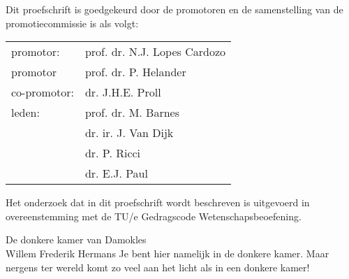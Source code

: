 \newpage
\thispagestyle{empty}

\noindent
Dit proefschrift is goedgekeurd door de promotoren en de samenstelling van de promotiecommissie is als volgt:\\[7mm]

\noindent
\begin{tabular}{@{}l p{9.8cm}}
promotor:                   &   prof. dr. N.J. Lopes Cardozo \\
promotor                    &   prof. dr. P. Helander \\
co-promotor:                &   dr. J.H.E. Proll \\
leden:                      &   prof. dr. M. Barnes \\
                            &   dr. ir. J. Van Dijk \\
                            &   dr. P. Ricci \\
                            &   dr. E.J. Paul \\
\end{tabular}

\vfill
\noindent
Het onderzoek dat in dit proefschrift wordt beschreven is uitgevoerd in overeenstemming met de TU/e Gedragscode Wetenschapsbeoefening. \newpage
\thispagestyle{empty}
\vspace*{\fill}
\begin{myquoting}{{\rm De donkere kamer van Damokles}\\{\rm Willem Frederik Hermans \nocite{hermans2012donkere}}}
Je bent hier namelijk in de donkere kamer. Maar nergens ter wereld komt zo veel aan het licht als in een donkere kamer!
\end{myquoting}